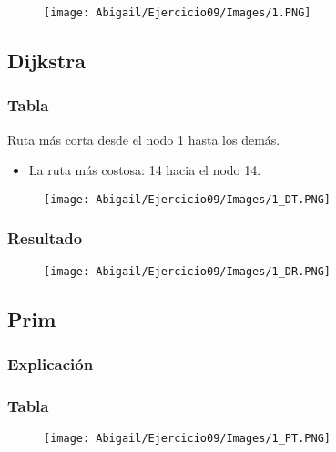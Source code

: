 \documentclass[12pt]{article}
\begin{document}
    \begin{figure}[h!]
      \centering
      \texttt{[image: Abigail/Ejercicio09/Images/1.PNG]}
    \end{figure} 

    \subsection{Dijkstra}

      \subsubsection{Tabla}
        Ruta más corta desde el nodo 1 hasta los demás.

        \begin{itemize}
          \item La ruta más costosa: 14 hacia el nodo 14.
        \end{itemize}

        \begin{figure}[h!]
          \centering
          \texttt{[image: Abigail/Ejercicio09/Images/1\_DT.PNG]}
        \end{figure} 

      \subsubsection{Resultado}
        \begin{figure}[h!]
          \centering
          \texttt{[image: Abigail/Ejercicio09/Images/1\_DR.PNG]}
        \end{figure} 


    \subsection{Prim}

      \subsubsection{Explicación}

      \subsubsection{Tabla}
        \begin{figure}[h!]
          \centering
          \texttt{[image: Abigail/Ejercicio09/Images/1\_PT.PNG]}
        \end{figure} 
\end{document}
